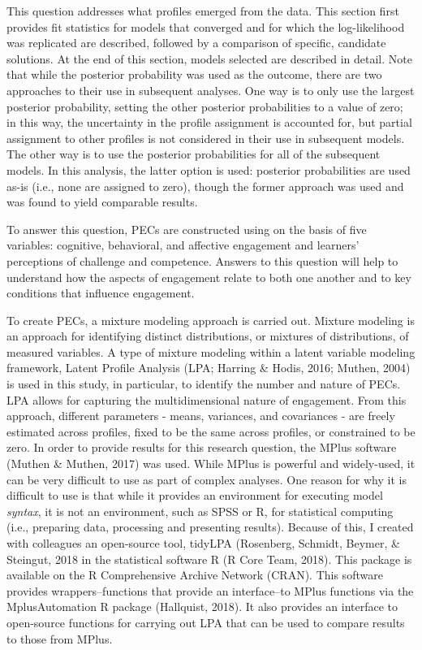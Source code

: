 \documentclass[]{msu-thesis}
\theoremstyle{definition}
\theoremstyle{definition}
\theoremstyle{definition}
\theoremstyle{remark}
\begin{document}
This question addresses what profiles emerged from the data. This
section first provides fit statistics for models that converged and for
which the log-likelihood was replicated are described, followed by a
comparison of specific, candidate solutions. At the end of this section,
models selected are described in detail. Note that while the posterior
probability was used as the outcome, there are two approaches to their
use in subsequent analyses. One way is to only use the largest posterior
probability, setting the other posterior probabilities to a value of
zero; in this way, the uncertainty in the profile assignment is
accounted for, but partial assignment to other profiles is not
considered in their use in subsequent models. The other way is to use
the posterior probabilities for all of the subsequent models. In this
analysis, the latter option is used: posterior probabilities are used
as-is (i.e., none are assigned to zero), though the former approach was
used and was found to yield comparable results.

To answer this question, PECs are constructed using on the basis of five
variables: cognitive, behavioral, and affective engagement and learners'
perceptions of challenge and competence. Answers to this question will
help to understand how the aspects of engagement relate to both one
another and to key conditions that influence engagement.

To create PECs, a mixture modeling approach is carried out. Mixture
modeling is an approach for identifying distinct distributions, or
mixtures of distributions, of measured variables. A type of mixture
modeling within a latent variable modeling framework, Latent Profile
Analysis (LPA; Harring \& Hodis, 2016; Muthen, 2004) is used in this
study, in particular, to identify the number and nature of PECs. LPA
allows for capturing the multidimensional nature of engagement. From
this approach, different parameters - means, variances, and covariances
- are freely estimated across profiles, fixed to be the same across
profiles, or constrained to be zero. In order to provide results for
this research question, the MPlus software (Muthen \& Muthen, 2017) was
used. While MPlus is powerful and widely-used, it can be very difficult
to use as part of complex analyses. One reason for why it is difficult
to use is that while it provides an environment for executing model
\emph{syntax}, it is not an environment, such as SPSS or R, for
statistical computing (i.e., preparing data, processing and presenting
results). Because of this, I created with colleagues an open-source
tool, tidyLPA (Rosenberg, Schmidt, Beymer, \& Steingut, 2018 in the
statistical software R (R Core Team, 2018). This package is available on
the R Comprehensive Archive Network (CRAN). This software provides
wrappers--functions that provide an interface--to MPlus functions via
the MplusAutomation R package (Hallquist, 2018). It also provides an
interface to open-source functions for carrying out LPA that can be used
to compare results to those from MPlus.
\end{document}
